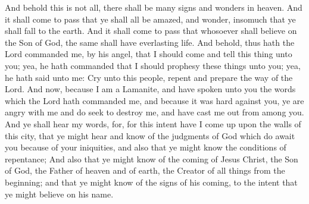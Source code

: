 \bverse \iffalse And behold this is not all, there shall be many signs and wonders in heaven. \fi
And behold this is not all, there shall be many signs and wonders in heaven.
\bverse \iffalse And it shall come to pass that ye shall all be amazed, and wonder, insomuch that ye shall fall to the earth. \fi
And it shall come to pass that ye shall all be amazed, and wonder, insomuch that ye shall fall to the earth.
\bverse \iffalse And it shall come to pass that whosoever shall believe on the Son of God, the same shall have everlasting life. \fi
And it shall come to pass that whosoever shall believe on the Son of God, the same shall have everlasting life.
\bverse \iffalse And behold, thus hath the Lord commanded me, by his angel, that I should come and tell this thing unto you; yea, he hath commanded that I should prophesy these things unto you; yea, he hath said unto me: Cry unto this people, repent and prepare the way of the Lord. \fi
And behold, thus hath the Lord commanded me, by his angel, that I should come and tell this thing unto you; yea, he hath commanded that I should prophesy these things unto you; yea, he hath said unto me: Cry unto this people, repent and prepare the way of the Lord.
\bverse \iffalse And now, because I am a Lamanite, and have spoken unto you the words which the Lord hath commanded me, and because it was hard against you, ye are angry with me and do seek to destroy me, and have cast me out from among you. \fi
And now, because I am a Lamanite, and have spoken unto you the words which the Lord hath commanded me, and because it was hard against you, ye are angry with me and do seek to destroy me, and have cast me out from among you.
\bverse \iffalse And ye shall hear my words, for, for this intent have I come up upon the walls of this city, that ye might hear and know of the judgments of God which do await you because of your iniquities, and also that ye might know the conditions of repentance; \fi
And ye shall hear my words, for, for this intent have I come up upon the walls of this city, that ye might hear and know of the judgments of God which do await you because of your iniquities, and also that ye might know the conditions of repentance;
\bverse \iffalse And also that ye might know of the coming of Jesus Christ, the Son of God, the Father of heaven and of earth, the Creator of all things from the beginning; and that ye might know of the signs of his coming, to the intent that ye might believe on his name. \fi
And also that ye might know of the coming of Jesus Christ, the Son of God, the Father of heaven and of earth, the Creator of all things from the beginning; and that ye might know of the signs of his coming, to the intent that ye might believe on his name.
